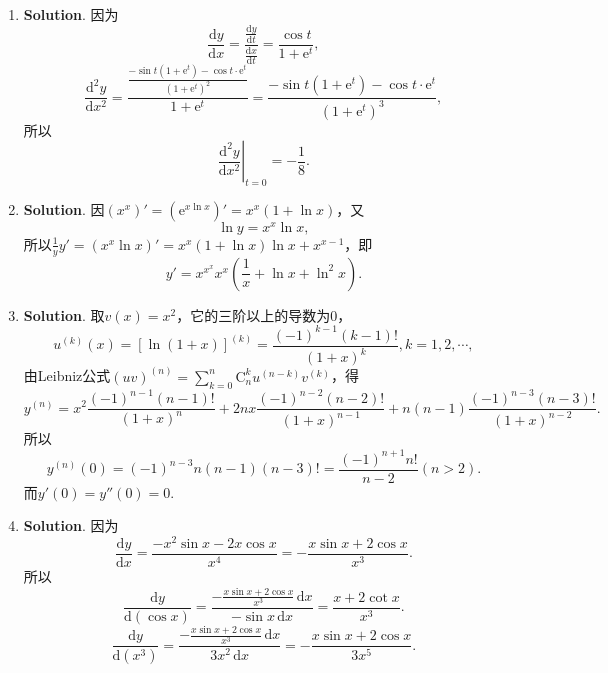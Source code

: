 \documentclass[../main.tex]{subfiles}
\begin{document}
\begin{enumerate}
          $x=k\pi+\frac{\pi}{2}(k=0,\pm1,\pm2,\cdots)$是可去间断点.因为
          \[
              \lim_{x\to k\pi+\frac{\pi}{2}}\exp\left({\frac{|x|}{\tan x}}\right)=\mathrm{e}^{0}
              =1.
          \]

    \item \textbf{Solution}. 因为
          \[
              \frac{\mathrm{d}y}{\mathrm{d}x}=\frac{\frac{\mathrm{d}y}{\mathrm{d}t}}{\frac{\mathrm{d}x}{\mathrm{d}t}}
              =\frac{\cos t}{1+\mathrm{e}^{t}},
          \]
          \[
              \frac{\mathrm{d}^{2} y}{\mathrm{d}x^{2}}=\frac{\frac{-\sin t\left(1+\mathrm{e}^{t}\right)-\cos
                      t\cdot\mathrm{e}^{t}}{\left(1+\mathrm{e}^{t}\right)^{2}}}{1+\mathrm{e}^{t}}
              =\frac{-\sin t\left(1+\mathrm{e}^{t}\right)-\cos t\cdot\mathrm{e}^{t}}{\left(1+\mathrm{e}^{t}\right)^{3}},
          \]
          所以
          \[
              \left.\frac{\mathrm{d}^{2} y}{\mathrm{d}x^{2}}\right|_{t=0}=-\frac{1}{8}.
          \]

    \item \textbf{Solution}. 因$\left(x^{x}\right)'=\left(\mathrm{e}^{x\ln x}\right
              )'=x^{x}(1+\ln x)$，又
          \[
              \ln y=x^{x}\ln x,
          \]
          所以$\frac{1}{y}y'=\left(x^{x}\ln x\right)'=x^{x}(1+\ln x)\ln x+x^{x-1}$，即
          \[
              y'=x^{x^x}x^{x}\left(\frac{1}{x}+\ln x+\ln^{2} x\right).
          \]

    \item \textbf{Solution}. 取$v(x)=x^{2}$，它的三阶以上的导数为0，
          \[
              u^{(k)}(x)=\left[\ln(1+x)\right]^{(k)}=\frac{(-1)^{k-1}(k-1)!}{(1+x)^{k}}
              ,k=1,2,\cdots,
          \]
          由Leibniz公式$(uv)^{(n)}=\sum_{k=0}^{n}\mathrm{C}_{n}^{k}u^{(n-k)}v^{(k)}$，得
          \[
              y^{(n)}=x^{2}\frac{(-1)^{n-1}(n-1)!}{(1+x)^{n}}+2nx\frac{(-1)^{n-2}(n-2)!}{(1+x)^{n-1}}
              +n(n-1)\frac{(-1)^{n-3}(n-3)!}{(1+x)^{n-2}}.
          \]
          所以
          \[
              y^{(n)}(0)=(-1)^{n-3}n(n-1)(n-3)!=\frac{(-1)^{n+1}n!}{n-2}(n>2).
          \]
          而$y'(0)=y''(0)=0$.

    \item \textbf{Solution}. 因为
          \[
              \frac{\mathrm{d}y}{\mathrm{d}x}=\frac{-x^{2}\sin x-2x\cos
                  x}{x^{4}}=-\frac{x\sin x+2\cos x}{x^{3}}.
          \]
          所以
          \[
              \frac{\mathrm{d}y}{\mathrm{d}(\cos x)}=\frac{-\frac{x\sin x+2\cos x}{x^{3}}\,\mathrm{d}x}{-\sin
                  x\,\mathrm{d}x}=\frac{x+2\cot x}{x^{3}}.
          \]
          \[
              \frac{\mathrm{d}y}{\mathrm{d}(x^{3})}=\frac{-\frac{x\sin x+2\cos x}{x^{3}}\,\mathrm{d}x}{3x^{2}\,\mathrm{d}x}
              =-\frac{x\sin x+2\cos x}{3x^{5}}.
          \]
\end{enumerate}
\end{document}
